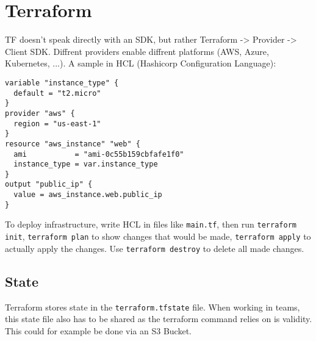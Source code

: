 \section{Terraform}
TF doesn't speak directly with an SDK, but rather Terraform -> Provider -> Client SDK. Diffrent providers enable diffrent platforms (AWS, Azure, Kubernetes, ...). A sample in HCL (Hashicorp Configuration Language):
\begin{lstlisting}[language=hcl]
variable "instance_type" {
  default = "t2.micro"
}
provider "aws" {
  region = "us-east-1"
}
resource "aws_instance" "web" {
  ami           = "ami-0c55b159cbfafe1f0"
  instance_type = var.instance_type
}
output "public_ip" {
  value = aws_instance.web.public_ip
}
\end{lstlisting}
To deploy infrastructure, write HCL in files like \texttt{main.tf}, then run \texttt{terraform init}, \texttt{terraform plan} to show changes that would be made, \texttt{terraform apply} to actually apply the changes. Use \texttt{terraform destroy} to delete all made changes.
\subsection{State}
Terraform stores state in the \texttt{terraform.tfstate} file. When working in teams, this state file also has to be shared as the terraform command relies on is validity. This could for example be done via an S3 Bucket.

